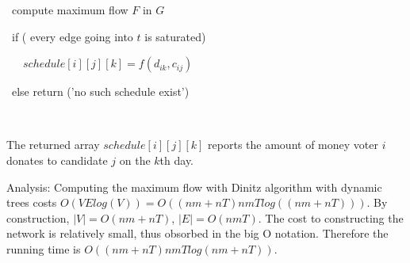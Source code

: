 \documentclass[a4paper,12pt]{article}
\begin{document}
\ compute maximum flow $F$ in $G$

\ if ( every edge going into $t$ is saturated)

\ \ \ $schedule[i][j][k]=f(d_{ik},c_{ij})$

\ else return ('no such schedule exist')

\

The returned array $schedule[i][j][k]$ reports the amount of money voter $i$ donates to candidate $j$ on the $k$th day.

Analysis:
Computing the maximum flow with Dinitz algorithm with dynamic trees costs $O(VElog(V))=O((nm+nT)nmTlog((nm+nT)))$. By construction, $\left|V\right|=O(nm+nT)$, $\left|E\right|=O(nmT)$. The cost to constructing the network is relatively small, thus obsorbed in the big O notation. Therefore the running time is $O((nm+nT)nmTlog(nm+nT))$.
\end{document}
